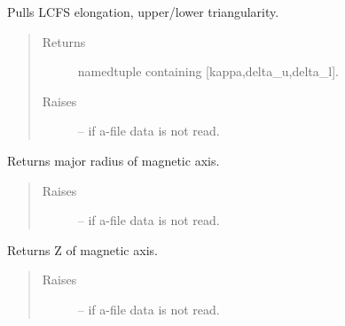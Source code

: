 \documentclass[letterpaper,10pt,english]{sphinxmanual}
\begin{document}
\begin{fulllineitems}
\begin{fulllineitems}
\begin{quote}
\begin{description}
\end{description}\end{quote}

\end{fulllineitems}


\begin{fulllineitems}
\label{eqtools:eqtools.eqdskreader.EqdskReader.getShaping}
Pulls LCFS elongation, upper/lower triangularity.
\begin{quote}\begin{description}
\item[{Returns}] \leavevmode
namedtuple containing {[}kappa,delta\_u,delta\_l{]}.

\item[{Raises}] \leavevmode
{} -- 
if a-file data is not read.

\end{description}\end{quote}

\end{fulllineitems}


\begin{fulllineitems}
\label{eqtools:eqtools.eqdskreader.EqdskReader.getMagR}
Returns major radius of magnetic axis.
\begin{quote}\begin{description}
\item[{Raises}] \leavevmode
{} -- 
if a-file data is not read.

\end{description}\end{quote}

\end{fulllineitems}


\begin{fulllineitems}
\label{eqtools:eqtools.eqdskreader.EqdskReader.getMagZ}
Returns Z of magnetic axis.
\begin{quote}\begin{description}
\item[{Raises}] \leavevmode
{} -- 
if a-file data is not read.


\end{description}
\end{quote}
\end{fulllineitems}
\end{fulllineitems}
\end{document}
